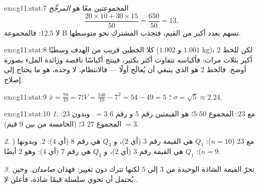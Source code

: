 \begin{solution}{exo:g11:stat:7}
 المجموعتين معًا هو  \emph{المرجَّح}
\[
\frac{20 \times 10 + 30 \times 15}{50} = \frac{650}{50} = 13,
\]
لا $12.5$: فالمجموعة B تسهم بعدد أكبر من القيم، فتجذب  المشترك
نحو متوسطها.
\end{solution}

\begin{solution}{exo:g11:stat:8}
كلا الخطين قريب من الهدف وسطيًا ($1.002$ و $1.001$ kg)، لكن
 للخط 2 أكبر بثلاث مرات: فأكياسه تتفاوت
أكثر بكثير، فينتج أكياسًا ناقصة وزائدة الملء بصورة أوضح. فالخط 2
هو الذي ينبغي أن يُعالَج أولًا --- فالانتظام، لا  وحده، هو ما
يحتاج إلى إصلاح.
\end{solution}

\begin{solution}{exo:g11:stat:9}
$\bar x = \frac{70}{10} = 7$؛
$V = \frac{540}{10} - 7^2 = 54 - 49 = 5$؛
$\sigma = \sqrt5 \approx 2.24$.
\end{solution}

\begin{solution}{exo:g11:stat:10}
\emph{1.} مع $23$: المجموع $50$  $5$؛  هو  القيمتين رقم $5$ و
رقم $6$ $= 3$. وبدون $23$: المجموع $27$  $3$؛  (الخامسة من بين 9
قيم) $= 3$.

\emph{2.} مع $23$ ($n = 10$): $Q_1$ هي القيمة رقم $3$ (أي $2$)، و $Q_3$ هي
رقم $8$ (أي $4$):  $2$. وبدونها ($n = 9$): $Q_1$ هي
القيمة رقم $3$ (أي $2$)، و $Q_3$ هي رقم $7$ (أي $4$): وهو $2$ أيضًا.

\emph{3.} تجرّ القيمة الشاذة الوحيدة  من $3$ إلى $5$ لكنها تترك
  دون تغيير: فهذان
\emph{صامدان}. وحين يُحتمل أن تحوي سلسلة قيمًا شاذة، فأعلن
  لا  .
\end{solution}

